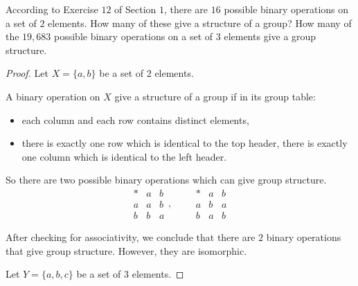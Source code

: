 \begin{exercise}
    According to Exercise $12$ of Section $1$, there are $16$ possible binary operations on a set of $2$ elements. How many of these give a structure of a group? How many of the $19,683$ possible binary operations on a set of $3$ elements give a group structure.
\end{exercise}

\begin{proof}
    Let $X = \{ a, b \}$ be a set of $2$ elements.

    A binary operation on $X$ give a structure of a group if in its group table:
    \begin{itemize}
        \item each column and each row contains distinct elements,
        \item there is exactly one row which is identical to the top header, there is exactly one column which is identical to the left header.
    \end{itemize}

    So there are two possible binary operations which can give group structure.
    \[
        \begin{array}{c|cc}
            * & a & b \\
            \hline
            a & a & b \\
            b & b & a
        \end{array},\qquad
        \begin{array}{c|cc}
            * & a & b \\
            \hline
            a & b & a \\
            b & a & b
        \end{array}
    \]

    After checking for associativity, we conclude that there are $2$ binary operations that give group structure. However, they are isomorphic.

    Let $Y = \{ a, b, c \}$ be a set of $3$ elements.


\end{proof}
